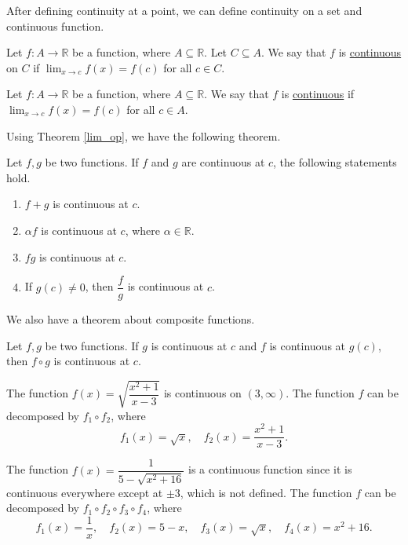 \documentclass[11pt]{book}
\theoremstyle{break}
\theoremstyle{no_label}
\newcommand{\bbR}{\mathbb{R}}
\numberwithin{equation}{section}
\begin{document}
After defining continuity at a point, we can define continuity on a set and continuous function.

\begin{definition}[Continuous]
    Let $f:A\to\bbR$ be a function, where $A\subseteq\bbR$. Let $C\subseteq A$. We say that $f$ is \underline{continuous} on $C$ if $\displaystyle\lim_{x\to c}f(x)=f(c)$ for all $c\in C$.
\end{definition}

\begin{definition}[Continuous]
    Let $f:A\to\bbR$ be a function, where $A\subseteq\bbR$. We say that $f$ is \underline{continuous} if $\displaystyle\lim_{x\to c}f(x)=f(c)$ for all $c\in A$.
\end{definition}

Using Theorem \ref{lim_op}, we have the following theorem.

\begin{theorem}
    Let $f, g$ be two functions. If $f$ and $g$ are continuous at $c$, the following statements hold.
    \begin{enumerate}
        \item $f+g$ is continuous at $c$.
        \item $\alpha f$ is continuous at $c$, where $\alpha\in\bbR$.
        \item $fg$ is continuous at $c$.
        \item If $g(c)\ne0$, then $\dfrac{f}{g}$ is continuous at $c$.
    \end{enumerate}
\end{theorem}

We also have a theorem about composite functions.

\begin{theorem}
    Let $f, g$ be two functions. If $g$ is continuous at $c$ and $f$ is continuous at $g(c)$, then $f\circ g$ is continuous at $c$.
\end{theorem}

\begin{example} 
    The function $f(x)=\sqrt{\dfrac{x^2+1}{x-3}}$ is continuous on $(3, \infty)$. The function $f$ can be decomposed by $f_1\circ f_2$, where \begin{equation*}
        f_1(x)=\sqrt{x},\quad f_2(x)=\dfrac{x^2+1}{x-3}.
    \end{equation*}
\end{example}

\begin{example} 
    The function $f(x)=\dfrac{1}{5-\sqrt{x^2+16}}$ is a continuous function since it is continuous everywhere except at $\pm3$, which is not defined. The function $f$ can be decomposed by $f_1\circ f_2\circ f_3\circ f_4$, where \begin{equation*}
        f_1(x)=\dfrac{1}{x}, \quad f_2(x)=5-x, \quad f_3(x)=\sqrt{x}, \quad f_4(x)=x^2+16.
    \end{equation*}
\end{example}
\end{document}

